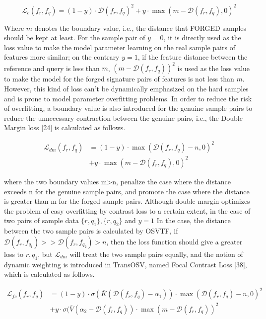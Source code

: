\begin{equation}
\label{eq15}
  \mathcal{L}_c (f_r,f_q ) = (1 - y)\cdot \mathcal{D}(f_r,f_q)^2 + y\cdot \max⁡(m - \mathcal{D}(f_r,f_q),0)^2 
\end{equation}

Where $m$ denotes the boundary value, i.e., the distance that FORGED samples should be kept at least. For the sample pair of $y=0$, it is directly used as the loss value to make the model parameter learning on the real sample pairs of features more similar; on the contrary $y=1$, if the feature distance between the reference and query is less than $m$, $(m - \mathcal{D}(f_r,f_q ))^2$ is used as the loss value to make the model for the forged signature pairs of features is not less than $m$. However, this kind of loss can't be dynamically emphasized on the hard samples and is prone to model parameter overfitting problems. In order to reduce the risk of overfitting, a boundary value is also introduced for the genuine sample pairs to reduce the unnecessary contraction between the genuine pairs, i.e., the Double-Margin loss [24] is calculated as follows.

\begin{equation}
\label{eq16}
\begin{aligned}
  \mathcal{L}_{dm} (f_r,f_q ) &= (1-y)\cdot \max(\mathcal{D}(f_r,f_q )-n,0)^2 \\
  &+ y\cdot \max⁡(m-\mathcal{D}(f_r,f_q),0)^2
\end{aligned}  
\end{equation}

where the two boundary values m>n, penalize the case where the distance exceeds n for the genuine sample pairs, and promote the case where the distance is greater than m for the forged sample pairs. Although double margin optimizes the problem of easy overfitting by contrast loss to a certain extent, in the case of two pairs of sample data $\{r,q_1 \},\{r,q_2\}$ and $y=1$ In the case, the distance between the two sample pairs is calculated by OSVTF, if $\mathcal{D}(f_r,f_{q_1}) >> \mathcal{D}(f_r,f_{q_2}) > n $, then the loss function should give a greater loss to ${r,q_1}$, but $\mathcal{L}_{dm}$ will treat the two sample pairs equally, and the notion of dynamic weighting is introduced in TransOSV, named Focal Contrast Loss [38], which is calculated as follows.

\begin{equation}
\label{eq17}
\begin{aligned}
  \mathcal{L}_{fc}(f_r,f_q ) &= (1 - y)\cdot \sigma(\overline{K}(\mathcal{D}(f_r,f_q )-\alpha_1 ))\cdot \max⁡(\mathcal{D}(f_r,f_q)-n,0)^2 \\
  &+ y\cdot \sigma(\overline{V} (\alpha_2 - \mathcal{D}(f_r,f_q))\cdot \max⁡(m - \mathcal{D}(f_r,f_q ))^2 \\
\end{aligned}
\end{equation}

